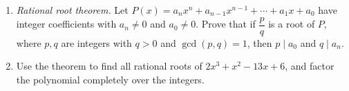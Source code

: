 \begin{enumerate}
\item[(a)] \emph{Rational root theorem.} Let $P(x)=a_nx^n+a_{n-1}x^{n-1}+\cdots+a_1x+a_0$ have integer coefficients with $a_n\ne0$ and $a_0\ne0$. Prove that if $\dfrac pq$ is a root of $P$, where $p,q$ are integers with $q>0$ and $\gcd(p,q)=1$, then $p\mid a_0$ and $q\mid a_n$.
\item[(b)] Use the theorem to find all rational roots of $2x^3+x^2-13x+6$, and factor the polynomial completely over the integers.
\end{enumerate}
